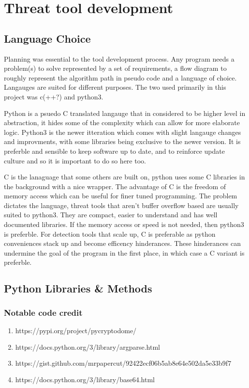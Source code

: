 

\chapter{Threat tool development}
\section{Language Choice}
Planning was essential to the tool development process. Any program needs a problem(s) to solve represented by a set of requirements, a flow diagram to roughly represent the algorithm path in pseudo code and a language of choice.
Langauges are suited for different purposes. The two used primarily in this project was c(++?) and python3. 

Python is a psuedo C translated langauge that in considered to be higher level in abstraction, it hides some of the complexity which can allow for 
more elaborate logic. Python3 is the newer itteration which comes with slight langauge changes and improvments, with some libraries being exclusive to the newer version. It is preferble and sensible to keep software up to date, and to reinforce update culture and so it is important to do so here too.

C is the lanaguage that some others are built on, python uses some C libraries in the background with a nice wrapper. The advantage of C is the freedom of memory access which can be useful for finer tuned programming. The problem dictates the language, threat tools that aren't buffer overflow based are usually suited to python3.
They are compact, easier to understand and has well documented libraries. If the memory access or speed is not needed, then python3 is preferble. For detection tools that scale up, C is preferable as python conveniences stack up and become efficency hinderances. These hinderances can undermine the goal of the program in the first place, in which case a C variant is preferble.



\section{Python Libraries \& Methods}
\subsection{Notable code credit}
\begin{enumerate}
    \item https://pypi.org/project/pycryptodome/
    \item https://docs.python.org/3/library/argparse.html
    \item https://gist.github.com/mrpapercut/92422ecf06b5ab8e64e502da5e33b9f7
    \item https://docs.python.org/3/library/base64.html
\end{enumerate}

